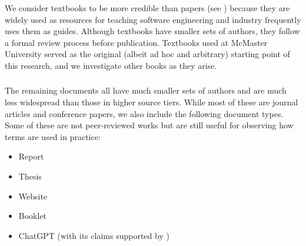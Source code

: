 \subsubsection{}\label{texts}

We consider textbooks to be more credible than papers (see )
because they are widely used as resources for teaching software engineering and
industry frequently uses them as guides. Although textbooks have smaller sets of
authors, they follow a formal review process before publication. Textbooks used
at McMaster University \citep{Patton2006,PetersAndPedrycz2000,vanVliet2000}
served as the original (albeit ad hoc and arbitrary) starting point of this
research, and we investigate other books as they arise. \addTextEx{}

\subsubsection{}\label{papers}

The remaining documents all have much smaller sets of authors and are much less
widespread than those in higher source tiers. While most of these are journal
articles and conference papers, we also include the following document types.
Some of these are not peer-reviewed works but are still useful for
observing how terms are used in practice:

\begin{itemize}
    \item Report \citep{Kam2008,Gerrard2000a,Gerrard2000b}
    \item Thesis \citep{Bas2024}
    \item Website \citep{LambdaTest2024,Pandey2023}
    \item Booklet \citep{SPICE2022}
    \item \ifnotpaper \else ChatGPT \fi \citet{ChatGPT2024} (with its claims
          supported by \citet{RusEtAl2008})
\end{itemize}

